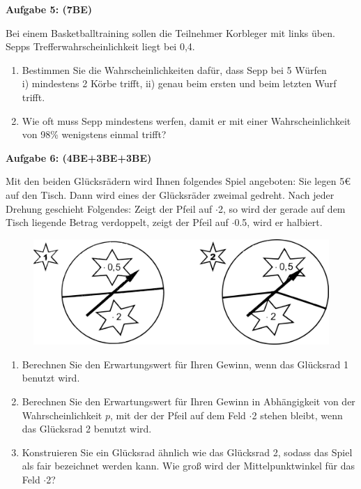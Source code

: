 \documentclass[a4paper,12pt]{article}
\newcommand{\Aufgabe}[1]{
  {
  \vspace*{0.5cm}
  \textsf{\textbf{Aufgabe #1}}
  \vspace*{0.2cm}
  
  }
}
\begin{document}


\Aufgabe{5: (7BE)} 
Bei einem Basketballtraining sollen die Teilnehmer Korbleger mit links üben. Sepps Trefferwahrscheinlichkeit liegt bei 0,4.
\begin{enumerate}[label={\alph*)}] 
  \item Bestimmen Sie die Wahrscheinlichkeiten dafür, dass Sepp bei 5 Würfen\\
    i) mindestens 2 Körbe trifft,  ii) genau beim ersten und beim letzten Wurf trifft.
  \item Wie oft muss Sepp mindestens werfen, damit er mit einer Wahrscheinlichkeit von 98\% wenigstens einmal trifft?
\end{enumerate}

\Aufgabe{6: (4BE+3BE+3BE)} 
Mit den beiden Glücksrädern wird Ihnen folgendes Spiel angeboten: Sie legen 5€ auf den Tisch. Dann wird eines der Glücksräder zweimal gedreht. Nach jeder Drehung geschieht Folgendes: Zeigt der Pfeil auf $\cdot$2, so wird der gerade auf dem Tisch liegende Betrag verdoppelt, zeigt der Pfeil auf $\cdot$0.5, wird er halbiert.

\begin{figure}[H]
  \centering
  \includegraphics[width=0.7\columnwidth]{211203_gluecksraeder.png}
\end{figure}

\begin{enumerate}[label={\alph*)}] 
  \item Berechnen Sie den Erwartungswert für Ihren Gewinn, wenn das Glücksrad 1 benutzt wird.
  \item Berechnen Sie den Erwartungswert für Ihren Gewinn in Abhängigkeit von der Wahrscheinlichkeit $p$, mit der der Pfeil auf dem Feld $\cdot$2 stehen bleibt, wenn das Glücksrad 2 benutzt wird.
  \item Konstruieren Sie ein Glücksrad ähnlich wie das Glücksrad 2, sodass das Spiel als fair bezeichnet werden kann. Wie groß wird der Mittelpunktwinkel für das Feld $\cdot$2?
\end{enumerate}
\end{document}
